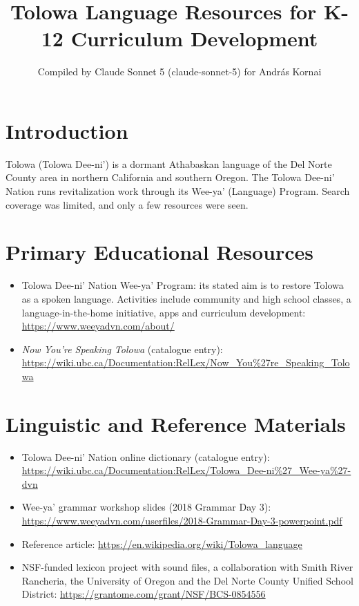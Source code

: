 \documentclass[12pt]{article}
\title{Tolowa Language Resources for K-12 Curriculum Development}
\author{Compiled by Claude Sonnet 5 (claude-sonnet-5) for Andr\'as Kornai}
\date{}
\begin{document}
\maketitle

\section{Introduction}
Tolowa (Tolowa Dee-ni') is a dormant Athabaskan language of the Del Norte County area in northern California and southern Oregon. The Tolowa Dee-ni' Nation runs revitalization work through its Wee-ya' (Language) Program. Search coverage was limited, and only a few resources were seen.

\section{Primary Educational Resources}
\begin{itemize}
\item Tolowa Dee-ni' Nation Wee-ya' Program: its stated aim is to restore Tolowa as a spoken language. Activities include community and high school classes, a language-in-the-home initiative, apps and curriculum development: \url{https://www.weeyadvn.com/about/}
\item \emph{Now You're Speaking Tolowa} (catalogue entry): \url{https://wiki.ubc.ca/Documentation:RelLex/Now_You%27re_Speaking_Tolowa}
\end{itemize}

\section{Linguistic and Reference Materials}
\begin{itemize}
\item Tolowa Dee-ni' Nation online dictionary (catalogue entry): \url{https://wiki.ubc.ca/Documentation:RelLex/Tolowa_Dee-ni%27_Wee-ya%27-dvn}
\item Wee-ya' grammar workshop slides (2018 Grammar Day 3): \url{https://www.weeyadvn.com/userfiles/2018-Grammar-Day-3-powerpoint.pdf}
\item Reference article: \url{https://en.wikipedia.org/wiki/Tolowa_language}
\item NSF-funded lexicon project with sound files, a collaboration with Smith River Rancheria, the University of Oregon and the Del Norte County Unified School District: \url{https://grantome.com/grant/NSF/BCS-0854556}
\end{itemize}
\end{document}
